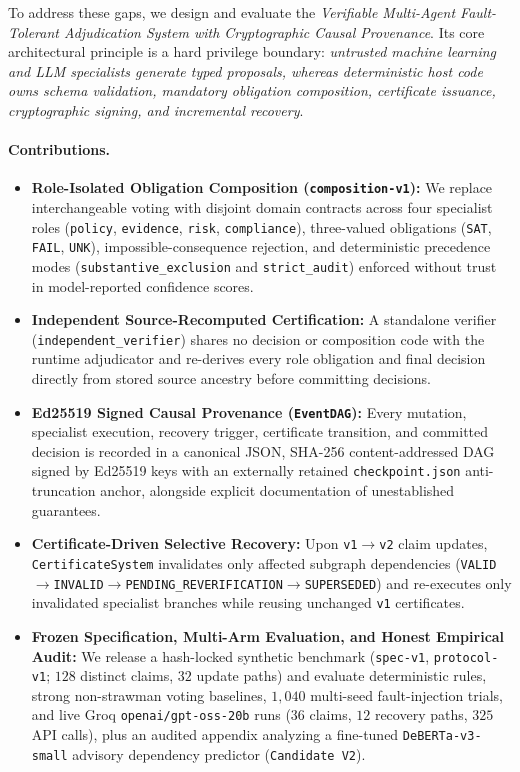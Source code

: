 \documentclass[11pt,a4paper]{article}
\begin{document}
To address these gaps, we design and evaluate the \emph{Verifiable Multi-Agent Fault-Tolerant Adjudication System with Cryptographic Causal Provenance}. Its core architectural principle is a hard privilege boundary: \emph{untrusted machine learning and LLM specialists generate typed proposals, whereas deterministic host code owns schema validation, mandatory obligation composition, certificate issuance, cryptographic signing, and incremental recovery}.

\paragraph{Contributions.}
\begin{itemize}[leftmargin=*,itemsep=2pt]
    \item \textbf{Role-Isolated Obligation Composition (\texttt{composition-v1}):} We replace interchangeable voting with disjoint domain contracts across four specialist roles (\texttt{policy}, \texttt{evidence}, \texttt{risk}, \texttt{compliance}), three-valued obligations (\texttt{SAT}, \texttt{FAIL}, \texttt{UNK}), impossible-consequence rejection, and deterministic precedence modes (\texttt{substantive\_exclusion} and \texttt{strict\_audit}) enforced without trust in model-reported confidence scores.
    \item \textbf{Independent Source-Recomputed Certification:} A standalone verifier (\texttt{independent\_verifier}) shares no decision or composition code with the runtime adjudicator and re-derives every role obligation and final decision directly from stored source ancestry before committing decisions.
    \item \textbf{Ed25519 Signed Causal Provenance (\texttt{EventDAG}):} Every mutation, specialist execution, recovery trigger, certificate transition, and committed decision is recorded in a canonical JSON, SHA-256 content-addressed DAG signed by Ed25519 keys with an externally retained \texttt{checkpoint.json} anti-truncation anchor, alongside explicit documentation of unestablished guarantees.
    \item \textbf{Certificate-Driven Selective Recovery:} Upon \texttt{v1}$\rightarrow$\texttt{v2} claim updates, \texttt{CertificateSystem} invalidates only affected subgraph dependencies (\texttt{VALID}$\rightarrow$\texttt{INVALID}$\rightarrow$\texttt{PENDING\_REVERIFICATION}$\rightarrow$\texttt{SUPERSEDED}) and re-executes only invalidated specialist branches while reusing unchanged \texttt{v1} certificates.
    \item \textbf{Frozen Specification, Multi-Arm Evaluation, and Honest Empirical Audit:} We release a hash-locked synthetic benchmark (\texttt{spec-v1}, \texttt{protocol-v1}; $128$ distinct claims, $32$ update paths) and evaluate deterministic rules, strong non-strawman voting baselines, $1{,}040$ multi-seed fault-injection trials, and live Groq \texttt{openai/gpt-oss-20b} runs ($36$ claims, $12$ recovery paths, $325$ API calls), plus an audited appendix analyzing a fine-tuned \texttt{DeBERTa-v3-small} advisory dependency predictor (\texttt{Candidate V2}).
\end{itemize}
\end{document}
